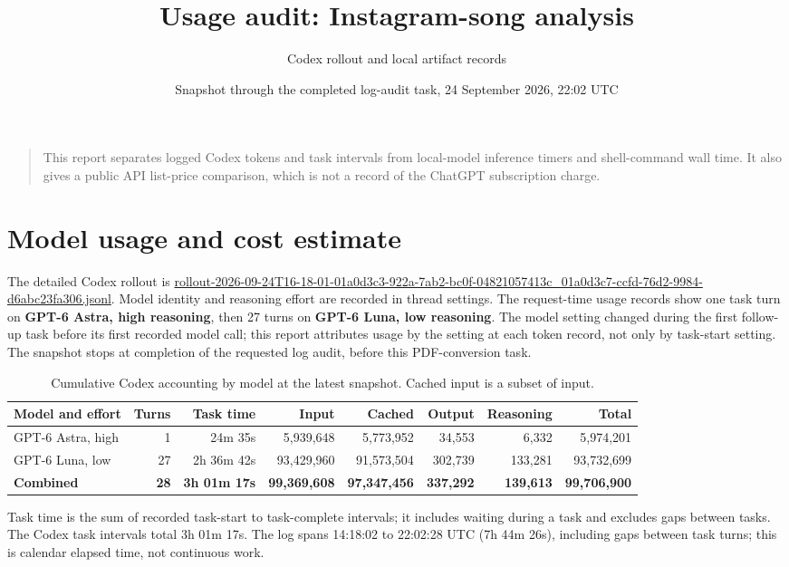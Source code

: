 \documentclass[10pt]{article}
\title{Usage audit: Instagram-song analysis}
\author{Codex rollout and local artifact records}
\date{Snapshot through the completed log-audit task, 24 September 2026, 22:02 UTC}
\newcommand{\smallnote}[1]{{\small\color{muted}#1}}
\begin{document}
\maketitle
\vspace{-1.0em}
\begin{quote}\small
This report separates logged Codex tokens and task intervals from local-model inference timers and shell-command wall time. It also gives a public API list-price comparison, which is not a record of the ChatGPT subscription charge.
\end{quote}

\section{Model usage and cost estimate}
The detailed Codex rollout is \url{rollout-2026-09-24T16-18-01-01a0d3c3-922a-7ab2-bc0f-04821057413c_01a0d3c7-ccfd-76d2-9984-d6abc23fa306.jsonl}. Model identity and reasoning effort are recorded in thread settings. The request-time usage records show one task turn on \textbf{GPT-6 Astra, high reasoning}, then 27 turns on \textbf{GPT-6 Luna, low reasoning}. The model setting changed during the first follow-up task before its first recorded model call; this report attributes usage by the setting at each token record, not only by task-start setting. The snapshot stops at completion of the requested log audit, before this PDF-conversion task.

\begin{table}[ht]
\centering\footnotesize\setlength{\tabcolsep}{3pt}
\caption{Cumulative Codex accounting by model at the latest snapshot. Cached input is a subset of input.}
\begin{tabularx}{\linewidth}{X r r r r r r r}
\toprule
\textbf{Model and effort} & \textbf{Turns} & \textbf{Task time} & \textbf{Input} & \textbf{Cached} & \textbf{Output} & \textbf{Reasoning} & \textbf{Total}\\
\midrule
GPT-6 Astra, high & 1 & 24m 35s & 5,939,648 & 5,773,952 & 34,553 & 6,332 & 5,974,201\\
GPT-6 Luna, low & 27 & 2h 36m 42s & 93,429,960 & 91,573,504 & 302,739 & 133,281 & 93,732,699\\
\midrule
\textbf{Combined} & \textbf{28} & \textbf{3h 01m 17s} & \textbf{99,369,608} & \textbf{97,347,456} & \textbf{337,292} & \textbf{139,613} & \textbf{99,706,900}\\
\bottomrule
\end{tabularx}
\end{table}
\smallnote{Task time is the sum of recorded task-start to task-complete intervals; it includes waiting during a task and excludes gaps between tasks. The Codex task intervals total 3h 01m 17s. The log spans 14:18:02 to 22:02:28 UTC (7h 44m 26s), including gaps between task turns; this is calendar elapsed time, not continuous work.}
\end{document}
